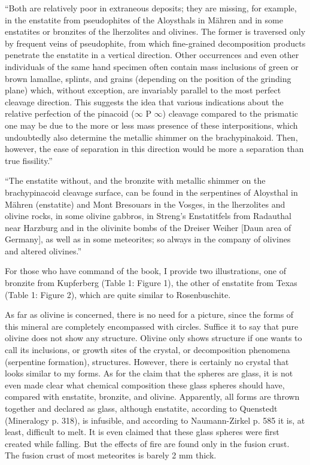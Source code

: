 \documentclass[a4paper, 11pt, oneside]{article}
\begin{document}
``Both are relatively poor in extraneous deposits; they are missing, for example, in the enstatite from pseudophites of the Aloysthals in Mähren and in some enstatites or bronzites of the lherzolites and olivines. The former is traversed only by frequent veins of pseudophite, from which fine-grained decomposition products penetrate the enstatite in a vertical direction. Other occurrences and even other individuals of the same hand specimen often contain mass inclusions of green or brown lamallae, splints, and grains (depending on the position of the grinding plane) which, without exception, are invariably parallel to the most perfect cleavage direction. This suggests the idea that various indications about the relative perfection of the pinacoid ($\infty$ P $\infty$) cleavage compared to the prismatic one may be due to the more or less mass presence of these interpositions, which undoubtedly also determine the metallic shimmer on the brachypinakoid. Then, however, the ease of separation in this direction would be more a separation than true fissility.''

``The enstatite without, and the bronzite with metallic shimmer on the brachypinacoid cleavage surface, can be found in the serpentines of Aloysthal in Mähren (enstatite) and Mont Bresouars in the Vosges, in the lherzolites and olivine rocks, in some olivine gabbros, in Streng's Enstatitfels from Radauthal near Harzburg and in the olivinite bombs of the Dreiser Weiher [Daun area of Germany], as well as in some meteorites; so always in the company of olivines and altered olivines.''

For those who have command of the book, I provide two illustrations, one of bronzite from Kupferberg (Table 1: Figure 1), the other of enstatite from Texas (Table 1: Figure 2), which are quite similar to Rosenbuschite.

As far as olivine is concerned, there is no need for a picture, since the forms of this mineral are completely encompassed with circles. Suffice it to say that pure olivine does not show any structure. Olivine only shows structure if one wants to call its inclusions, or growth sites of the crystal, or decomposition phenomena (serpentine formation), structures. However, there is certainly no crystal that looks similar to my forms. As for the claim that the spheres are glass, it is not even made clear what chemical composition these glass spheres should have, compared with enstatite, bronzite, and olivine. Apparently, all forms are thrown together and declared as glass, although enstatite, according to Quenstedt (Mineralogy p. 318), is infusible, and according to Naumann-Zirkel p. 585 it is, at least, difficult to melt. It is even claimed that these glass spheres were first created while falling. But the effects of fire are found only in the fusion crust. The fusion crust of most meteorites is barely 2 mm thick.
\end{document}
